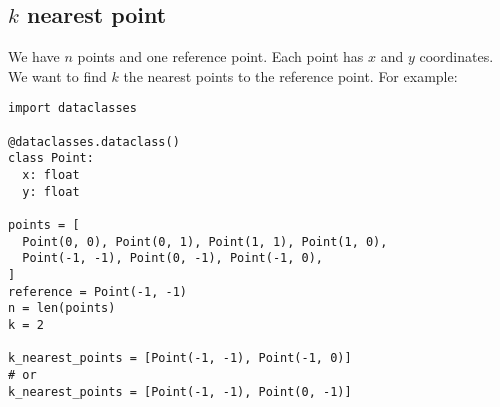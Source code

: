 \subsection{$k$ nearest point}

We have $n$ points and one reference point.
Each point has $x$ and $y$ coordinates.
We want to find $k$ the nearest points to the reference point.
For example:

\begin{verbatim}
import dataclasses

@dataclasses.dataclass()
class Point:
  x: float
  y: float

points = [
  Point(0, 0), Point(0, 1), Point(1, 1), Point(1, 0),
  Point(-1, -1), Point(0, -1), Point(-1, 0),
]
reference = Point(-1, -1)
n = len(points)
k = 2

k_nearest_points = [Point(-1, -1), Point(-1, 0)]
# or
k_nearest_points = [Point(-1, -1), Point(0, -1)]
\end{verbatim}

